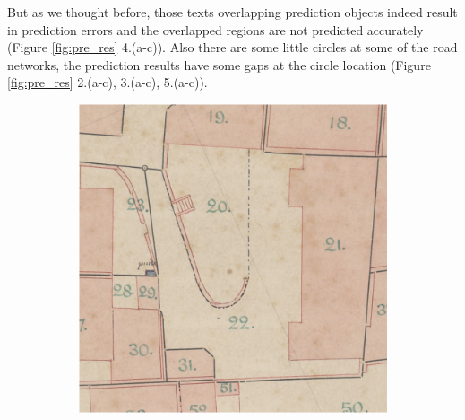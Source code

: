 \documentclass[12pt]{article}
\begin{document}
But as we thought before, those texts overlapping prediction objects indeed result in prediction errors and the overlapped regions are not predicted accurately (Figure \ref{fig:pre_res} 4.(a-c)). Also there are some little circles at some of the road networks, the prediction results have some gaps at the circle location (Figure \ref{fig:pre_res} 2.(a-c), 3.(a-c), 5.(a-c)).

\begin{figure}[H]
    \centering
    \begin{subfigure}[b]{.28\textwidth}
		\begin{minipage}[t]{1\linewidth}
			\centering
			\includegraphics[width=1\linewidth]{images/patches/img3.png}
		\end{minipage}
	\end{subfigure}
	\begin{subfigure}[b]{.28\textwidth}
		\begin{minipage}[t]{1\linewidth}
			\centering

\end{minipage}
\end{subfigure}
\end{figure}
\end{document}
